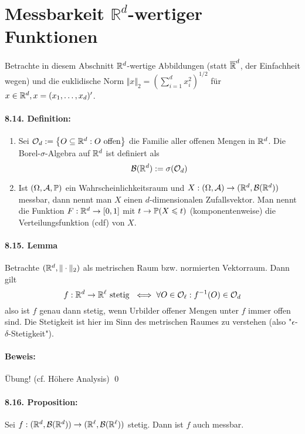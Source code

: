 \documentclass[11pt]{report}
\begin{document}
\section*{Messbarkeit $\mathbb{R}^d$-wertiger Funktionen}
Betrachte in diesem Abschnitt $\mathbb{R}^d$-wertige Abbildungen (statt $\overline{\mathbb{R}}^d$, der Einfachheit wegen) und die euklidische Norm $\Vert x\Vert_2=\left(\sum_{i=1}^dx_i^2\right)^{1/2}$ f\"ur $x\in\mathbb{R}^d,x=(x_1,\hdots,x_d)'$.

\paragraph{8.14. Definition:}
\begin{enumerate}[label=(\roman*)]
    \item Sei $\mathcal{O}_d:=\left\{O\subseteq\mathbb{R}^d:O \text{ offen}\right\}$ die Familie aller offenen Mengen in $\mathbb{R}^d$. Die Borel-$\sigma$-Algebra auf $\mathbb{R}^d$ ist definiert als
    $$\mathcal{B}(\mathbb{R}^d):=\sigma(\mathcal{O}_d)$$
    \item Ist $(\Omega, \mathcal{A}, \mathbb{P})$ ein Wahrscheinlichkeitsraum und $X:(\Omega,\mathcal{A})\to(\mathbb{R}^d,\mathcal{B}(\mathbb{R}^d))$ messbar, dann nennt man $X$ einen $d$-dimensionalen Zufallsvektor. Man nennt die Funktion $F:\mathbb{R}^d\to[0,1]$ mit $t\to\mathbb{P}(X\leqslant t)$ (komponentenweise) die Verteilungsfunktion (cdf) von $X$.
 \end{enumerate}
 
 \paragraph{8.15. Lemma}Betrachte $(\mathbb{R}^d,\Vert\cdot\Vert_2)$ als metrischen Raum bzw. normierten Vektorraum. Dann gilt
 $$f:\mathbb{R}^d\to\mathbb{R}^\ell\text{ stetig }\iff\forall O\in\mathcal{O}_\ell: f^{-1}(O)\in\mathcal{O}_d$$
 also ist $f$ genau dann stetig, wenn Urbilder offener Mengen unter $f$ immer offen sind. Die Stetigkeit ist hier im Sinn des metrischen Raumes zu verstehen (also "$\epsilon$-$\delta$-Stetigkeit").
 
 \paragraph{Beweis:}\"Ubung! (cf. H\"ohere Analysis) \qed
 
 \paragraph{8.16. Proposition:} Sei $f:(\mathbb{R}^d,\mathcal{B}(\mathbb{R}^d))\to(\mathbb{R}^\ell,\mathcal{B}(\mathbb{R}^\ell))$ stetig. Dann ist $f$ auch messbar. 
 
\end{document}

